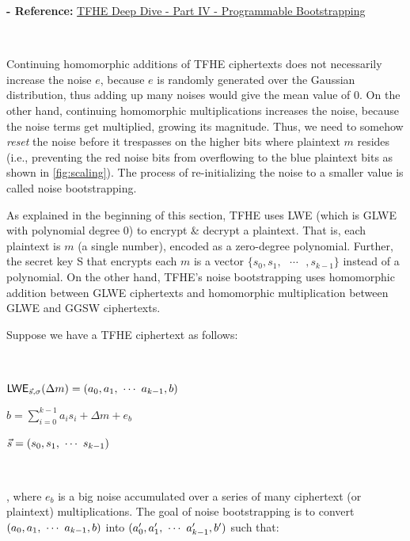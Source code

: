 \textbf{- Reference:} 
\href{https://www.zama.ai/post/tfhe-deep-dive-part-4}{TFHE Deep Dive - Part IV - Programmable Bootstrapping}~\cite{tfhe-4}

$ $

Continuing homomorphic additions of TFHE ciphertexts does not necessarily increase the noise $e$, because $e$ is randomly generated over the Gaussian distribution, thus adding up many noises would give the mean value of 0. On the other hand, continuing homomorphic multiplications increases the noise, because the noise terms get multiplied, growing its magnitude. Thus, we need to somehow \textit{reset} the noise before it trespasses on the higher bits where plaintext $m$ resides (i.e., preventing the red noise bits from overflowing to the blue plaintext bits as shown in \autoref{fig:scaling}). The process of re-initializing the noise to a smaller value is called noise bootstrapping.

As explained in the beginning of this section, TFHE uses LWE (which is GLWE with polynomial degree 0) to encrypt \& decrypt a plaintext. That is, each plaintext is $m$ (a single number), encoded as a zero-degree polynomial. Further, the secret key S that encrypts each $m$ is a vector $ \{s_0, s_1, \text{ } \cdots \text{ }, s_{k-1} \}$ instead of a polynomial. On the other hand, TFHE's noise bootstrapping uses homomorphic addition between GLWE ciphertexts and homomorphic multiplication between GLWE and GGSW ciphertexts.  


Suppose we have a TFHE ciphertext as follows: 

$ $

$\textsf{LWE}_{\vec{s}, \sigma}(\Delta m) = (a_0, a_1, \text{ } \text{$\cdots$} \text{ } a_{k-1}, b)$

$b = \sum\limits_{i=0}^{k-1} a_is_i + \Delta m + e_b$

$\vec{s} = (s_0, s_1, \text{ } \text{$\cdots$} \text{ } s_{k-1})$

$ $

, where $e_b$ is a big noise accumulated over a series of many ciphertext (or plaintext) multiplications. The goal of noise bootstrapping is to convert $(a_0, a_1, \text{ } \text{$\cdots$} \text{ } a_{k-1}, b)$ into $(a_0', a_1', \text{ } \text{$\cdots$} \text{ } a_{k-1}', b')$ such that: 

